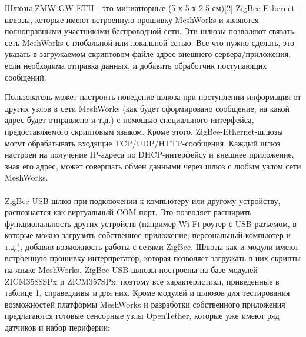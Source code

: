 \documentclass[11pt]{article}
\begin{document}
Шлюзы ZMW-GW-ETH - это миниатюрные (5 х 5 х 2.5 см)[2] ZigBee-Ethernet-шлюзы, которые 
имеют встроенную прошивку MeshWorks и являются полноправными участниками
беспроводной сети. Эти шлюзы позволяют связать сеть MeshWorks с глобальной или 
локальной сетью. Все что нужно сделать, это указать в загружаемом скриптовом файле
адрес внешнего сервера/приложения, если необходима отправка данных, и добавить
обработчик поступающих сообщений.

Пользователь может настроить поведение шлюза при поступлении информация от других 
узлов в сети MeshWorks (как будет сформировано сообщение, на какой адрес будет отправлено
и т.д.) с помощью специального интерфейса, предоставляемого скриптовым языком. 
Кроме этого, ZigBee-Ethernet-шлюзы могут обрабатывать входящие TCP/UDP/HTTP-сообщения.
Каждый шлюз настроен на получение IP-адреса по DHCP-интерфейсу и
внешнее приложение, зная его адрес, может совершать обмен данными через шлюз с любым
узлом сети MeshWorks.
\\\\
ZigBee-USB-шлюз при подключении к компьютеру или другому устройству, распознается
как виртуальный COM-порт. Это позволяет расширить функциональность других устройств
(например Wi-Fi-роутер с USB-разъемом, в которые можно загрузить собственное приложение;
персональный компьютер и т.д.), добавив возможность работы с сетями ZigBee. Шлюзы
как и модули имеют встроенную прошивку-интерпретатор, которая позволяет загружать
в них скрипты на языке MeshWorks. ZigBee-USB-шлюзы построены на базе модулей ZICM3588SPx и 
ZICM357SPx, поэтому все характеристики, приведенные в таблице 1, справедливы и для них.
\newpage
Кроме модулей и шлюзов для тестирования возможностей платформы MeshWorks и разработки
собственного приложения предлагаются готовые сенсорные узлы OpenTether, которые уже имеют
ряд датчиков и набор периферии:
\end{document}
